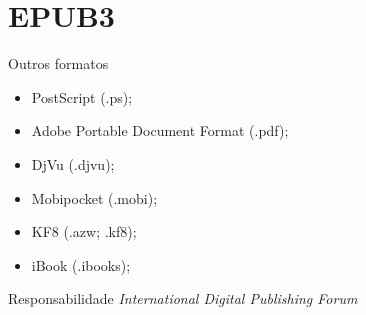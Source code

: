 \documentclass[11pt]{beamer}
\newcommand{\flang}[1]{\textit{#1}}
\begin{document}
\section{EPUB3}
\nocite{ebookFormat}
\begin{frame}{Outros formatos}
  \begin{itemize}
    \item PostScript (.ps);
      \pause
    \item Adobe Portable Document Format (.pdf);
      \pause
    \item DjVu (.djvu);
      \pause
    \item Mobipocket (.mobi);
      \pause
    \item KF8 (.azw; .kf8);
      \pause
    \item iBook (.ibooks);
  \end{itemize}
\end{frame}

\begin{frame}{Responsabilidade}
  \flang{International Digital Publishing Forum}
\end{frame}
\end{document}
